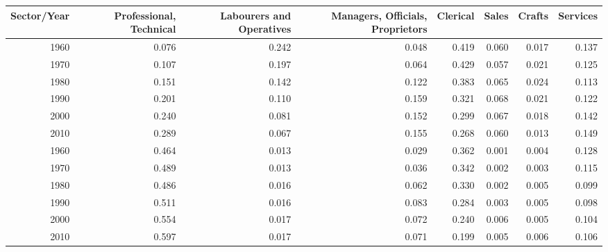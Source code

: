 \begin{tabular}{rrrrrrrr}
  \hline
Sector/Year & Professional, Technical & Labourers and Operatives & Managers, Officials, Proprietors & Clerical & Sales & Crafts & Services \\ 
  \hline
1960 & 0.076 & 0.242 & 0.048 & 0.419 & 0.060 & 0.017 & 0.137 \\ 
  1970 & 0.107 & 0.197 & 0.064 & 0.429 & 0.057 & 0.021 & 0.125 \\ 
  1980 & 0.151 & 0.142 & 0.122 & 0.383 & 0.065 & 0.024 & 0.113 \\ 
  1990 & 0.201 & 0.110 & 0.159 & 0.321 & 0.068 & 0.021 & 0.122 \\ 
  2000 & 0.240 & 0.081 & 0.152 & 0.299 & 0.067 & 0.018 & 0.142 \\ 
  2010 & 0.289 & 0.067 & 0.155 & 0.268 & 0.060 & 0.013 & 0.149 \\ 
  1960 & 0.464 & 0.013 & 0.029 & 0.362 & 0.001 & 0.004 & 0.128 \\ 
  1970 & 0.489 & 0.013 & 0.036 & 0.342 & 0.002 & 0.003 & 0.115 \\ 
  1980 & 0.486 & 0.016 & 0.062 & 0.330 & 0.002 & 0.005 & 0.099 \\ 
  1990 & 0.511 & 0.016 & 0.083 & 0.284 & 0.003 & 0.005 & 0.098 \\ 
  2000 & 0.554 & 0.017 & 0.072 & 0.240 & 0.006 & 0.005 & 0.104 \\ 
  2010 & 0.597 & 0.017 & 0.071 & 0.199 & 0.005 & 0.006 & 0.106 \\ 
   \hline
\end{tabular}
